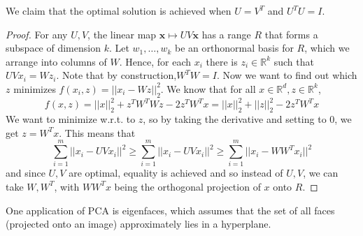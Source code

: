 \documentclass{article}
\begin{document}
    \begin{theorem}
    We claim that the optimal solution is achieved when $U = V^T$ and $U^T U = I$. 
    \end{theorem}
    \begin{proof}
        For any $U, V$, the linear map $\mathbf{x} \mapsto U V \mathbf{x}$ has a range $R$ that forms a subspace of dimension $k$. Let $w_1, \ldots,w_k$ be an orthonormal basis for $R$, which we arrange into columns of $W$. Hence, for each $x_i$ there is $z_i \in \mathbb{R}^k$ such that $UV x_i = W z_i$. Note that by construction,$W^T W = I$. Now we want to find out which $z$ minimizes $f(x_i, z) = ||x_i - W z||_2^2$. We know that for all $x \in \mathbb{R}^d, z \in \mathbb{R}^k$, 
    \[f(x, z) = ||x||_2^2 + z^T W^T W z - 2 z^T W^T x = ||x||_2^2 + ||z||_2^2 - 2 z^T W^T x\] 
    We want to minimize w.r.t. to $z$, so by taking the derivative and setting to $0$, we get $z = W^T x$. This means that 
    \[\sum_{i=1}^m ||x_i - U V x_i ||^2 \geq \sum_{i=1}^m ||x_i - UV x_i||^2 \geq \sum_{i=1}^m ||x_i - W W^T x_i||^2\] 
    and since $U, V$ are optimal, equality is achieved and so instead of $U, V$, we can take $W, W^T$, with $W W^T x$ being the orthogonal projection of $x$ onto $R$. 
    \end{proof}

    One application of PCA is eigenfaces, which assumes that the set of all faces (projected onto an image) approximately lies in a hyperplane. 
\end{document}
